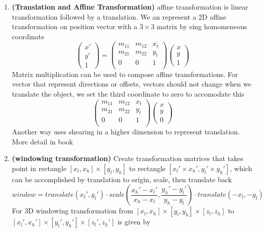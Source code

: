 \documentclass[11pt]{article}
\newcommand{\bheading}[1]{\textbf{(#1)}}
\begin{document}
\begin{enumerate}
    \item \bheading{Translation and Affine Transformation} affine transformation is linear transformation followed by a translation. We an represent a 2D affine transformation on position vector with a $3\times 3$ matrix by sing homomeneous coordinate
    \[
        \begin{pmatrix}
            x' \\ y' \\ 1 
        \end{pmatrix}   
        =
        \begin{pmatrix}
            m_{11} & m_{12} & x_t \\
            m_{21} & m_{22} & y_t \\
            0 & 0 & 1 \\
        \end{pmatrix}  
        \begin{pmatrix}
            x \\ y \\ 1
        \end{pmatrix}
    \]
    Matrix multiplication can be used to compose affine transformations. For vector that represent directions or offsets, vectors should not change when we translate the object, we set the third coordinate to zero to accomodate this
    \[
        \begin{pmatrix}
            m_{11} & m_{12} & x_t \\
            m_{21} & m_{22} & y_t \\
            0 & 0 & 1 \\
        \end{pmatrix}  
        \begin{pmatrix}
            x \\ y \\ 0
        \end{pmatrix}    
    \]
    Another way uses shearing in a higher dimension to represent translation. More detail in book
    \item \bheading{windowing transformation} Create transformation matrices that takes point in rectangle $[x_l,x_h] \times [y_l, y_h]$ to rectangle $[x_l'\times x_h', y_l' \times y_h']$, which can be accomplished by translation to origin, scale, then translate back
    \[
        window = 
        translate(x_l', y_l') \cdot
        scale(\frac{x_h' - x_l'}{x_h - x_l}, \frac{y_h' - y_l'}{y_h - y_l}) \cdot
        translate(-x_l, -y_l)
    \]
    For 3D windowing transformation from $[x_l,x_h] \times [y_l, y_h] \times [z_l, z_h]$ to $[x_l',x_h'] \times [y_l', y_h'] \times [z_l', z_h']$ is given by

\end{enumerate}
\end{document}
